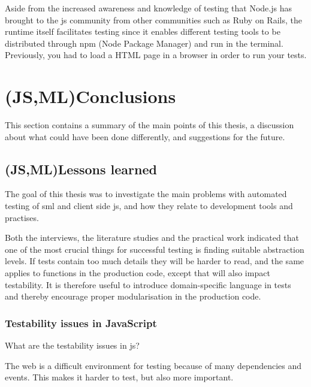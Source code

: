 \documentclass[11pt]{article}
\begin{document}
Aside from the increased awareness and knowledge of testing that Node.js has brought to the \gls{js} community from other communities such as Ruby on Rails, the runtime itself facilitates testing since it enables different testing tools to be distributed through npm (Node Package Manager) and run in the terminal. Previously, you had to load a HTML page in a browser in order to run your tests. \cite[question~9]{Stenmark}


\section{(JS,ML)Conclusions}
\label{sec:conclusions}

This section contains a summary of the main points of this thesis, a discussion about what could have been done differently, and suggestions for the future.

\subsection{(JS,ML)Lessons learned}

The goal of this thesis was to investigate the main problems with automated testing of \gls{sml} and client side \gls{js}, and how they relate to development tools and practises.

Both the interviews, the literature studies and the practical work indicated that one of the most crucial things for successful testing is finding suitable abstraction levels. If tests contain too much details they will be harder to read, and the same applies to functions in the production code, except that will also impact testability. It is therefore useful to introduce domain-specific language in tests \cite[p.~127]{Clean} and thereby encourage proper modularisation in the production code.

\subsubsection{Testability issues in JavaScript}
\label{subsubsec:whynotjs}

What are the testability issues in \gls{js}?

The web is a difficult environment for testing because of many dependencies and events. This makes it harder to test, but also more important.
\end{document}
